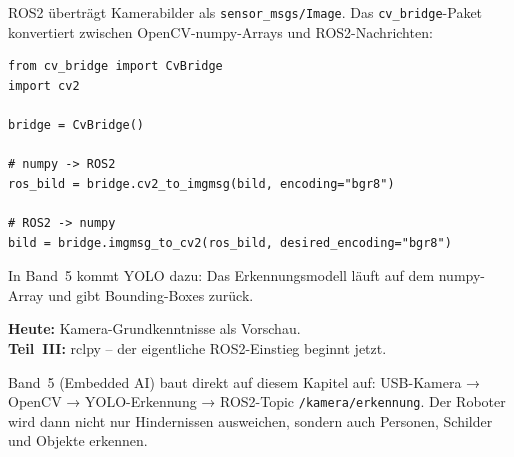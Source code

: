 \begin{wissenBox}
ROS2 überträgt Kamerabilder als \texttt{sensor\_msgs/Image}.
Das \texttt{cv\_bridge}-Paket konvertiert zwischen
OpenCV-numpy-Arrays und ROS2-Nachrichten:

\begin{lstlisting}
from cv_bridge import CvBridge
import cv2

bridge = CvBridge()

# numpy -> ROS2
ros_bild = bridge.cv2_to_imgmsg(bild, encoding="bgr8")

# ROS2 -> numpy
bild = bridge.imgmsg_to_cv2(ros_bild, desired_encoding="bgr8")
\end{lstlisting}

In Band~5 kommt YOLO dazu: Das Erkennungsmodell läuft auf dem
numpy-Array und gibt Bounding-Boxes zurück.
\end{wissenBox}

\begin{projektBox}
\textbf{Heute:} Kamera-Grundkenntnisse als Vorschau.\\
\textbf{Teil~III:} rclpy -- der eigentliche ROS2-Einstieg beginnt jetzt.
\end{projektBox}

\begin{robotikBox}
Band~5 (Embedded AI) baut direkt auf diesem Kapitel auf:
USB-Kamera → OpenCV → YOLO-Erkennung → ROS2-Topic \texttt{/kamera/erkennung}.
Der Roboter wird dann nicht nur Hindernissen ausweichen,
sondern auch Personen, Schilder und Objekte erkennen.
\end{robotikBox}
